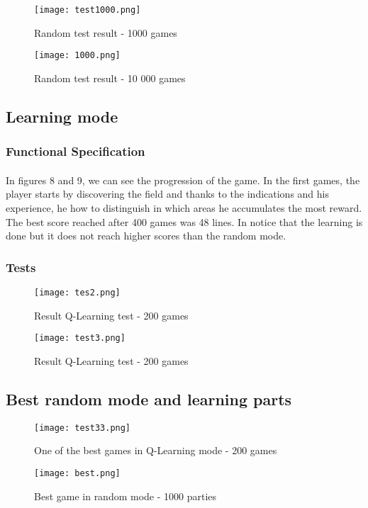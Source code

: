 \documentclass{article}
\begin{document}
\begin{figure}[!h]
\centering
\texttt{[image: test1000.png]}
\\%
\caption{Random test result - 1000 games}
\end{figure}

\begin{figure}[!h]
\centering
\texttt{[image: 1000.png]}
\\%
\caption{Random test result - 10 000 games}
\end{figure}

\subsection{Learning mode}
\subsubsection{Functional Specification}
\paragraph{}
\setlength{\parindent}{2cm}
In figures 8 and 9, we can see the progression of the game. In the first games, the player starts by discovering the field and thanks to the indications and his experience, he how to distinguish in which areas he accumulates the most reward. The best score reached after 400 games was 48 lines. In notice that the learning is done but it does not reach higher scores than the random mode. 
\subsubsection{Tests}
\begin{figure}[!h]
\centering
\texttt{[image: tes2.png]}
\\%
\caption{Result Q-Learning test - 200 games}
\end{figure}
\begin{figure}[!h]
\centering
\texttt{[image: test3.png]}
\\%
\caption{Result Q-Learning test - 200 games}
\end{figure}
\subsection{Best random mode and learning parts}
\begin{figure}[!h]
\centering
\texttt{[image: test33.png]}
\\%
\caption{One of the best games in Q-Learning mode - 200 games}
\end{figure}
\begin{figure}[!h]
\centering
\texttt{[image: best.png]}
\\%
\caption{Best game in random mode - 1000 parties}
\end{figure}
\newpage
\end{document}
